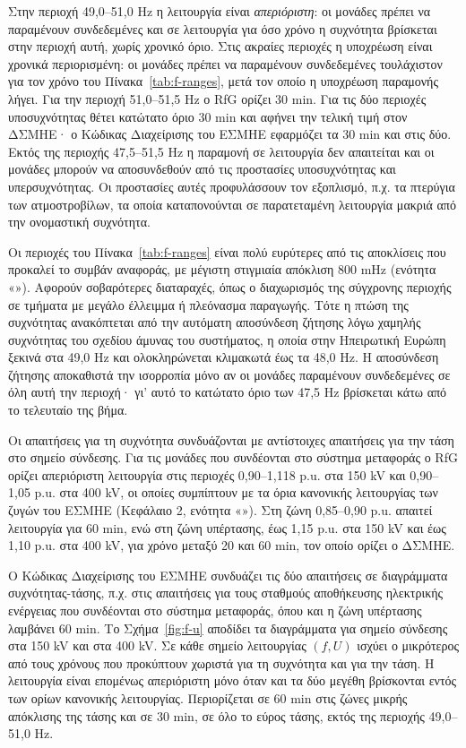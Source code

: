 Στην περιοχή 49,0--51,0 Hz η λειτουργία είναι \emph{απεριόριστη}: οι μονάδες πρέπει να
παραμένουν συνδεδεμένες και σε λειτουργία για όσο χρόνο η συχνότητα βρίσκεται στην περιοχή
αυτή, χωρίς χρονικό όριο. Στις ακραίες περιοχές η υποχρέωση είναι χρονικά περιορισμένη: οι
μονάδες πρέπει να παραμένουν συνδεδεμένες τουλάχιστον για τον χρόνο του
Πίνακα~\ref{tab:f-ranges}, μετά τον οποίο η υποχρέωση παραμονής λήγει. Για την περιοχή 51,0--51,5 Hz ο RfG ορίζει 30 min. Για τις δύο
περιοχές υποσυχνότητας θέτει κατώτατο όριο 30 min και αφήνει την τελική τιμή στον ΔΣΜΗΕ· ο
Κώδικας Διαχείρισης του ΕΣΜΗΕ εφαρμόζει τα 30 min και στις δύο. Εκτός της περιοχής
47,5--51,5 Hz η παραμονή σε λειτουργία δεν απαιτείται και οι μονάδες μπορούν να αποσυνδεθούν
από τις προστασίες υποσυχνότητας και υπερσυχνότητας. Οι προστασίες αυτές προφυλάσσουν τον
εξοπλισμό, π.χ. τα πτερύγια των ατμοστροβίλων, τα οποία καταπονούνται σε παρατεταμένη
λειτουργία μακριά από την ονομαστική συχνότητα.

Οι περιοχές του Πίνακα~\ref{tab:f-ranges} είναι πολύ ευρύτερες από τις αποκλίσεις που
προκαλεί το συμβάν αναφοράς, με μέγιστη στιγμιαία απόκλιση 800 mHz (ενότητα
«»). Αφορούν σοβαρότερες διαταραχές, όπως ο διαχωρισμός της
σύγχρονης περιοχής σε τμήματα με μεγάλο έλλειμμα ή πλεόνασμα παραγωγής. Τότε η πτώση της
συχνότητας ανακόπτεται από την αυτόματη αποσύνδεση ζήτησης λόγω χαμηλής συχνότητας του
σχεδίου άμυνας του συστήματος, η οποία στην Ηπειρωτική Ευρώπη ξεκινά στα 49,0 Hz και
ολοκληρώνεται κλιμακωτά έως τα 48,0 Hz. Η αποσύνδεση ζήτησης αποκαθιστά την ισορροπία μόνο
αν οι μονάδες παραμένουν συνδεδεμένες σε όλη αυτή την περιοχή· γι' αυτό το κατώτατο όριο των
47,5 Hz βρίσκεται κάτω από το τελευταίο της βήμα.

Οι απαιτήσεις για τη συχνότητα συνδυάζονται με αντίστοιχες απαιτήσεις για την τάση στο
σημείο σύνδεσης. Για τις μονάδες που συνδέονται στο σύστημα μεταφοράς ο RfG ορίζει
απεριόριστη λειτουργία στις περιοχές 0,90--1,118 p.u. στα 150 kV και 0,90--1,05 p.u. στα
400 kV, οι οποίες συμπίπτουν με τα όρια κανονικής λειτουργίας των ζυγών του ΕΣΜΗΕ
(Κεφάλαιο 2, ενότητα «»). Στη ζώνη 0,85--0,90 p.u. απαιτεί λειτουργία
για 60 min, ενώ στη ζώνη υπέρτασης, έως 1,15 p.u. στα 150 kV και έως 1,10 p.u. στα 400 kV,
για χρόνο μεταξύ 20 και 60 min, τον οποίο ορίζει ο ΔΣΜΗΕ.

Ο Κώδικας Διαχείρισης του ΕΣΜΗΕ συνδυάζει τις δύο απαιτήσεις σε διαγράμματα
συχνότητας-τάσης, π.χ. στις απαιτήσεις για τους σταθμούς αποθήκευσης ηλεκτρικής ενέργειας που
συνδέονται στο σύστημα μεταφοράς, όπου και η ζώνη υπέρτασης λαμβάνει 60 min. Το
Σχήμα~\ref{fig:f-u} αποδίδει τα διαγράμματα για σημείο σύνδεσης στα 150 kV και στα 400 kV.
Σε κάθε σημείο λειτουργίας $(f, U)$ ισχύει ο μικρότερος από τους χρόνους που προκύπτουν
χωριστά για τη συχνότητα και για την τάση. Η λειτουργία είναι επομένως απεριόριστη μόνο όταν
και τα δύο μεγέθη βρίσκονται εντός των ορίων κανονικής λειτουργίας. Περιορίζεται σε 60 min
στις ζώνες μικρής απόκλισης της τάσης και σε 30 min, σε όλο το εύρος τάσης, εκτός της
περιοχής 49,0--51,0 Hz.

